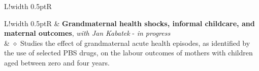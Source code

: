 \documentclass[11pt]{article}
\newcommand\VRule{\color{lightgray}\vrule width 0.5pt}
\begin{document}
\begin{flushleft}
\begin{tabular}{L!{\VRule}R}
    \end{tabular}
\end{flushleft}

\begin{flushleft}
    \begin{tabular}{L!{\VRule}R}
         & {\bf Grandmaternal health shocks, informal childcare, and maternal outcomes}, \textit{with Jan Kabatek} - \textit{in progress}                                                                                   \\
         & {\small $\diamond$ Studies the effect of grandmaternal acute health episodes, as identified by the use of selected PBS drugs, on the labour outcomes of mothers with children aged between zero and four years.} \\

\end{tabular}
\end{flushleft}
\end{document}

